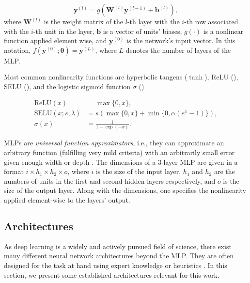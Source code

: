 \begin{equation}
  \pmb{y}^{(l)} = g ( \pmb{W}^{(l)} \pmb{y}^{(l-1)} + \pmb{b}^{(l)}),
  \label{eq:mlp_forward_pass}
\end{equation}
where $\pmb{W}^{(l)}$ is the weight matrix of the $l$-th layer with the $i$-th row associated with the $i$-th unit in the layer, $\pmb{b}$ is a vector of units' biases, $g(\cdot)$ is a nonlinear function applied element wise, and $\pmb{y}^{(0)}$ is the network's input vector. In this notation, $f(\pmb{y}^{(0)};\pmb{\theta}) = \pmb{y}^{(L)}$, where $L$ denotes the number of layers of the \ac{MLP}.

Most common nonlinearity functions are hyperbolic tangens ($\tanh$), \ac{ReLU} (), \ac{SELU} (), and the logistic sigmoid function $\sigma$ () \cite{Goodfellow-et-al-2016}

\begin{align}
  \text{ReLU}(x) &= \max\{0, x\},\label{eq:relu}\\
  \text{SELU}(x;s,\lambda) &= s (\max\{0,x\} + \min\{0, \alpha(e^x-1)\}), \label{eq:selu}\\
  \sigma (x) &= \frac{1}{1 + \exp (-x)}.\label{eq:logistic_sigmoid}
\end{align}

\acp{MLP} are \emph{universal function approximators}, i.e., they can approximate an arbitrary function (fulfilling very mild criteria) with an arbitrarily small error given enough width or depth \cite{Goodfellow-et-al-2016}.
The dimensions of a 3-layer \ac{MLP} are given in a format $i \times h_1 \times h_2 \times o$, where $i$ is the size of the input layer, $h_1$ and $h_2$ are the numbers of units in the first and second hidden layers respectively, and $o$ is the size of the output layer. Along with the dimensions, one specifies the nonlinearity applied element-wise to the layers' output.

\subsection{Architectures}

As deep learning is a widely and actively pursued field of science, there exist many different neural network architectures beyond the \ac{MLP}. They are often designed for the task at hand using expert knowledge or heuristics \cite{Goodfellow-et-al-2016}. In this section, we present some established architectures relevant for this work.

